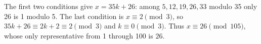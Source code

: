 The first two conditions give $x=35k+26$: among $5,12,19,26,33$ modulo 35 only 26 is 1 modulo 5. The last condition is $x\equiv 2\pmod 3$, so $35k+26\equiv 2k+2\equiv 2\pmod 3$ and $k\equiv 0\pmod 3$. Thus $x\equiv 26\pmod{105}$, whose only representative from 1 through 100 is $\boxed{26}$.
